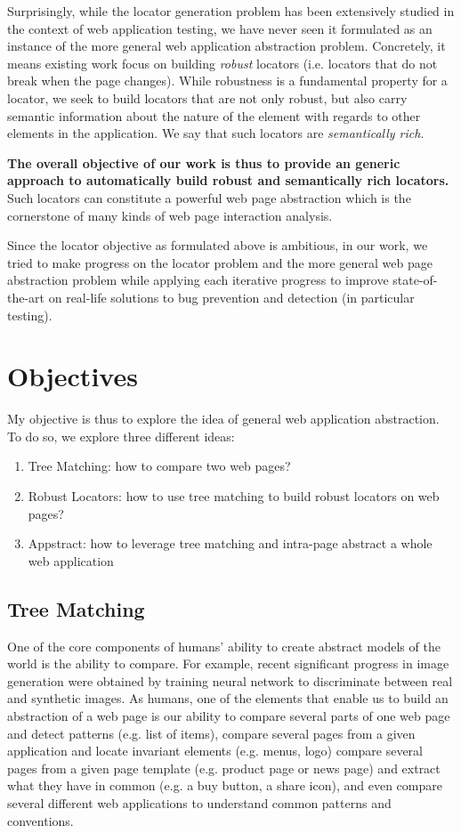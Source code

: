 Surprisingly, while the locator generation problem has been extensively studied in the context of web application testing, we have never seen it formulated as an instance of the more general web application abstraction problem.
Concretely, it means existing work focus on building \textit{robust} locators (i.e. locators that do not break when the page changes). While robustness is a fundamental property for a locator, we seek to build locators that are not only robust, but also carry semantic information about the nature of the element with regards to other elements in the application. We say that such locators are \textit{semantically rich}. 

\textbf{The overall objective of our work is thus to provide an generic approach to automatically build robust and semantically rich locators.}
Such locators can constitute a powerful web page abstraction which is the cornerstone of many kinds of web page interaction analysis.

Since the locator objective as formulated above is ambitious, in our work, we tried to make progress on the locator problem and the more general web page abstraction problem while applying each iterative progress to improve state-of-the-art on real-life solutions to bug prevention and detection (in particular testing).

\section{Objectives}
My objective is thus to explore the idea of general web application abstraction. To do so, we explore three different ideas:
\begin{enumerate}
\item Tree Matching: how to compare two web pages?
\item Robust Locators: how to use tree matching to build robust locators on web pages?
\item Appstract: how to leverage tree matching and intra-page abstract a whole web application
\end{enumerate}

\subsection{Tree Matching}
One of the core components of humans' ability to create abstract models of the world is the ability to compare.
For example, recent significant progress in image generation were obtained by training neural network to discriminate between real and synthetic images. As humans, one of the elements that enable us to build an abstraction of a web page is our ability 
to compare several parts of one web page and detect patterns (e.g. list of items), 
compare several pages from a given application and locate invariant elements (e.g. menus, logo)
compare several pages from a given page template (e.g. product page or news page) and extract what they have in common (e.g. a buy button, a share icon),
and even compare several different web applications to understand common patterns and conventions.

